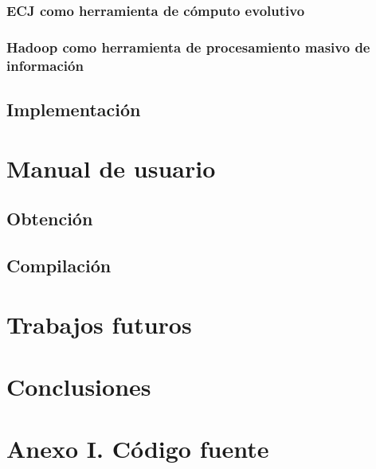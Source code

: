 \documentclass{estilos-y-libreria}
\begin{document}
		\subsection{ECJ como herramienta de c\'omputo evolutivo}
		\subsection{Hadoop como herramienta de procesamiento masivo de informaci\'on}
	\section{Implementaci\'on}

\chapter{Manual de usuario}
	\section{Obtenci\'on}
		
	\section{Compilaci\'on}
		

\chapter{Trabajos futuros}

\chapter{Conclusiones}

\chapter{Anexo I. C\'odigo fuente}

\end{document}
